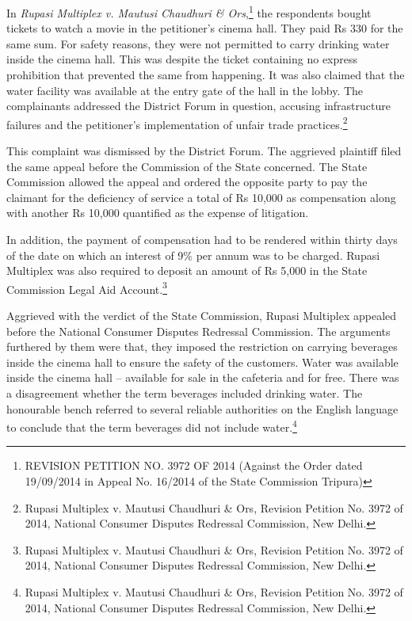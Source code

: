 \begin{multicols}{2}
\vspace{-.15cm}

\noi
In \textit{Rupasi Multiplex v. Mautusi Chaudhuri \& Ors},\footnote{REVISION PETITION NO. 3972 OF 2014 (Against the Order dated 19/09/2014 in Appeal No. 16/2014 of the State Commission Tripura)} the respondents bought tickets to watch a movie in the petitioner's cinema hall. They paid Rs 330 for the same sum. For safety reasons, they were not permitted to carry drinking water inside the cinema hall. This was despite the ticket containing no express prohibition that prevented the same from happening. It was also claimed that the water facility was available at the entry gate of the hall in the lobby. The complainants addressed the District Forum in question, accusing infrastructure failures and the petitioner's implementation of unfair trade practices.\footnote{ Rupasi Multiplex v. Mautusi Chaudhuri \& Ors, Revision Petition No. 3972 of 2014, National Consumer Disputes Redressal Commission, New Delhi.}

\vspace{-.1cm}

\noi
This complaint was dismissed by the District Forum. The aggrieved plaintiff filed the same appeal before the Commission of the State concerned. The State Commission allowed the appeal and ordered the opposite party to pay the claimant for the deficiency of service a total of Rs 10,000 as compensation along with another Rs 10,000 quantified as the expense of litigation.

\vspace{-.1cm}

\noi
In addition, the payment of compensation had to be rendered within thirty days of the date on
which an interest of 9\% per annum was to be charged. Rupasi Multiplex was also required to deposit an amount of Rs 5,000 in the State Commission Legal Aid Account.\footnote{Rupasi Multiplex v. Mautusi Chaudhuri \& Ors, Revision Petition No. 3972 of 2014, National Consumer Disputes Redressal Commission, New Delhi.}

\vspace{-.1cm}

\noi
Aggrieved with the verdict of the State Commission, Rupasi Multiplex appealed before the
National Consumer Disputes Redressal Commission. The arguments furthered by them were
that, they imposed the restriction on carrying beverages inside the cinema hall to ensure the
safety of the customers. Water was available inside the cinema hall – available for sale in the
cafeteria and for free. There was a disagreement whether the term beverages included drinking
water. The honourable bench referred to several reliable authorities on the English language to
conclude that the term beverages did not include water.\footnote{Rupasi Multiplex v. Mautusi Chaudhuri \& Ors, Revision Petition No. 3972 of 2014, National Consumer Disputes Redressal Commission, New Delhi.}


\end{multicols}

